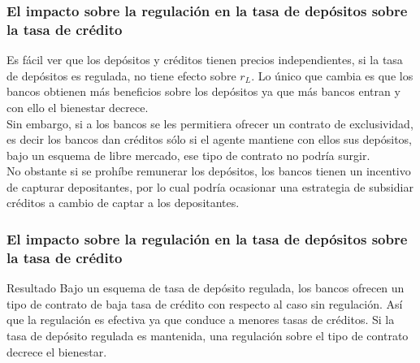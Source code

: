 \begin{frame}
    \frametitle{{\normalsize El impacto sobre la regulación en la tasa de depósitos sobre la tasa de crédito} {}}
   Es fácil ver que los depósitos y créditos tienen precios independientes, si la tasa de depósitos es regulada, no tiene efecto sobre $r_{L}$. Lo único que cambia es que los bancos obtienen más beneficios sobre los depósitos ya que más bancos entran y con ello el bienestar decrece.\\
   
    Sin embargo, si a los bancos se les permitiera ofrecer un contrato de exclusividad, es decir los bancos dan créditos sólo si el agente mantiene con ellos sus depósitos, bajo un esquema de libre mercado, ese tipo de contrato no podría surgir.\\
    No obstante si se prohíbe remunerar los depósitos, los bancos tienen un incentivo de capturar depositantes, por lo cual podría ocasionar una estrategia de subsidiar créditos a cambio de captar a los depositantes.
 

  
\end{frame}


\begin{frame}
\frametitle{{\normalsize El impacto sobre la regulación en la tasa de depósitos sobre la tasa de crédito} {}}

\begin{block} {Resultado}
	Bajo un esquema de tasa de depósito regulada, los bancos ofrecen un tipo de contrato de baja tasa de crédito con respecto al caso sin regulación. Así que la regulación es efectiva ya que conduce a menores tasas de créditos. Si la tasa de depósito regulada es mantenida, una regulación sobre el tipo de contrato decrece el bienestar. 
	
\end{block}	


\end{frame}